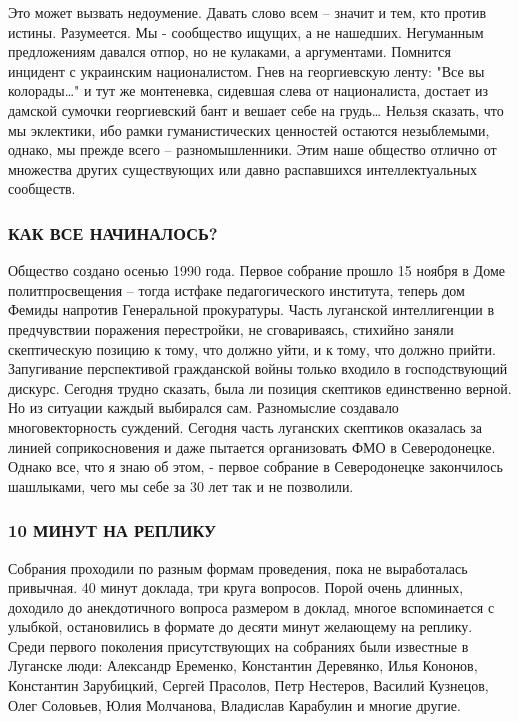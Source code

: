 Это может вызвать недоумение. Давать слово всем – значит и тем, кто против
истины. Разумеется. Мы - сообщество ищущих, а не нашедших. Негуманным
предложениям давался отпор, но не кулаками, а аргументами. Помнится
инцидент с украинским националистом. Гнев на георгиевскую ленту: "Все вы
колорады…" и тут же монтеневка, сидевшая слева от националиста, достает из
дамской сумочки георгиевский бант и вешает себе на грудь… Нельзя сказать,
что мы эклектики, ибо рамки гуманистических ценностей остаются
незыблемыми, однако, мы прежде всего – разномышленники. Этим наше общество
отлично от множества других существующих или давно распавшихся
интеллектуальных сообществ.

\subsubsection{КАК ВСЕ НАЧИНАЛОСЬ?}

Общество создано осенью 1990 года. Первое собрание прошло 15 ноября в Доме
политпросвещения – тогда истфаке педагогического института, теперь дом
Фемиды напротив Генеральной прокуратуры. Часть луганской интеллигенции в
предчувствии поражения перестройки, не сговариваясь, стихийно заняли
скептическую позицию к тому, что должно уйти, и к тому, что должно прийти.
Запугивание перспективой гражданской войны только входило в господствующий
дискурс. Сегодня трудно сказать, была ли позиция скептиков единственно
верной. Но из ситуации каждый выбирался сам. Разномыслие создавало
многовекторность суждений. Сегодня часть луганских скептиков оказалась за
линией соприкосновения и даже пытается организовать ФМО в Северодонецке.
Однако все, что я знаю об этом, - первое собрание в Северодонецке
закончилось шашлыками, чего мы себе за 30 лет так и не позволили.

\subsubsection{10 МИНУТ НА РЕПЛИКУ}

Собрания проходили по разным формам проведения, пока не выработалась
привычная. 40 минут доклада, три круга вопросов. Порой очень длинных,
доходило до анекдотичного вопроса размером в доклад, многое вспоминается с
улыбкой, остановились в формате до десяти минут желающему на реплику.
Среди первого поколения присутствующих на собраниях были известные в
Луганске люди: Александр Еременко, Константин Деревянко, Илья Кононов,
Константин Зарубицкий, Сергей Прасолов, Петр Нестеров, Василий Кузнецов,
Олег Соловьев, Юлия Молчанова, Владислав Карабулин и многие другие.

